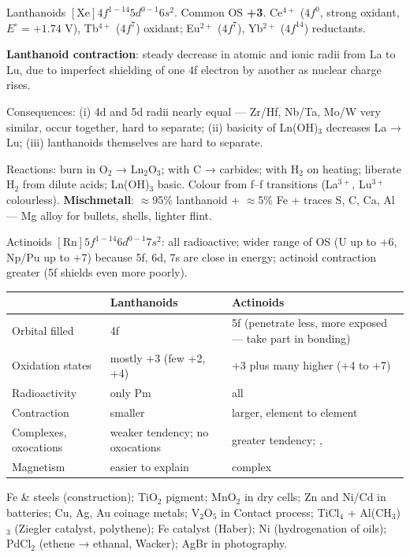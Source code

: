 \documentclass[9pt,a4paper]{extarticle}
\begin{document}
\begin{multicols}{2}
\begin{fl}
\item Lanthanoids $[\text{Xe}]4f^{1-14}5d^{0-1}6s^2$. Common OS \textbf{+3}. Ce$^{4+}$ ($4f^0$, strong oxidant, $E^\circ=+1.74$ V), Tb$^{4+}$ ($4f^7$) oxidant; Eu$^{2+}$ ($4f^7$), Yb$^{2+}$ ($4f^{14}$) reductants.
\item \textbf{Lanthanoid contraction}: steady decrease in atomic and ionic radii from La to Lu, due to imperfect shielding of one 4f electron by another as nuclear charge rises.
\item Consequences: (i) 4d and 5d radii nearly equal — Zr/Hf, Nb/Ta, Mo/W very similar, occur together, hard to separate; (ii) basicity of Ln(OH)$_3$ decreases La → Lu; (iii) lanthanoids themselves are hard to separate.
\item Reactions: burn in O$_2$ → Ln$_2$O$_3$; with C → carbides; with H$_2$ on heating; liberate H$_2$ from dilute acids; Ln(OH)$_3$ basic. Colour from f--f transitions (La$^{3+}$, Lu$^{3+}$ colourless). \textbf{Mischmetall}: $\approx$95\% lanthanoid + $\approx$5\% Fe + traces S, C, Ca, Al — Mg alloy for bullets, shells, lighter flint.
\item Actinoids $[\text{Rn}]5f^{1-14}6d^{0-1}7s^2$: all radioactive; wider range of OS (U up to +6, Np/Pu up to +7) because 5f, 6d, 7s are close in energy; actinoid contraction greater (5f shields even more poorly).
\end{fl}
{\scriptsize
\begin{tabularx}{\linewidth}{@{}l Y Y@{}}
\toprule
 & \textbf{Lanthanoids} & \textbf{Actinoids}\\
\midrule
Orbital filled & 4f & 5f (penetrate less, more exposed — take part in bonding)\\
Oxidation states & mostly +3 (few +2, +4) & +3 plus many higher (+4 to +7)\\
Radioactivity & only Pm & all\\
Contraction & smaller & larger, element to element\\
Complexes, oxocations & weaker tendency; no oxocations & greater tendency; , \\
Magnetism & easier to explain & complex\\
\bottomrule
\end{tabularx}\par}
\vspace{2pt}
{\scriptsize Fe \& steels (construction); TiO$_2$ pigment; MnO$_2$ in dry cells; Zn and Ni/Cd in batteries; Cu, Ag, Au coinage metals; V$_2$O$_5$ in Contact process; TiCl$_4$ + Al(CH$_3$)$_3$ (Ziegler catalyst, polythene); Fe catalyst (Haber); Ni (hydrogenation of oils); PdCl$_2$ (ethene → ethanal, Wacker); AgBr in photography.\par}


\end{multicols}
\end{document}
